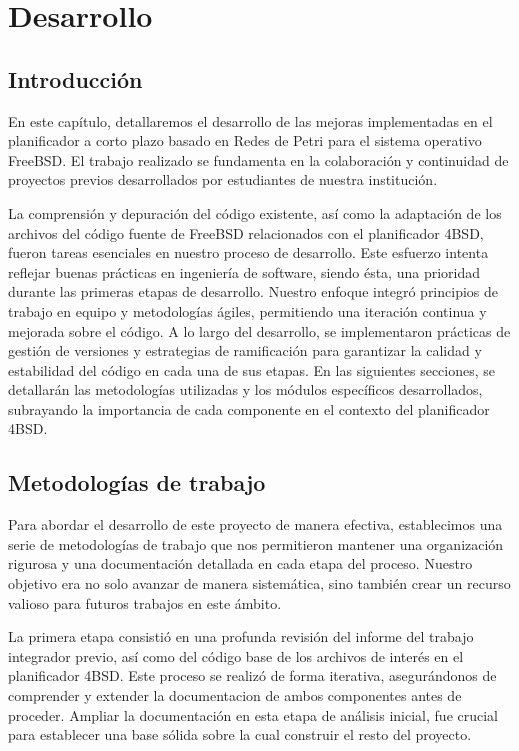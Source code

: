 \section{Desarrollo}

\subsection{Introducción}
En este capítulo, detallaremos el desarrollo de las mejoras implementadas en el planificador a corto plazo basado en Redes de Petri para el sistema operativo FreeBSD. El trabajo realizado se fundamenta en la colaboración y continuidad de proyectos previos desarrollados por estudiantes de nuestra institución.\par

La comprensión y depuración del código existente, así como la adaptación de los archivos del código fuente de FreeBSD relacionados con el planificador 4BSD, fueron tareas esenciales en nuestro proceso de desarrollo. Este esfuerzo intenta reflejar buenas prácticas en ingeniería de software, siendo ésta, una prioridad durante las primeras etapas de desarrollo. Nuestro enfoque integró principios de trabajo en equipo y metodologías ágiles, permitiendo una iteración continua y mejorada sobre el código. A lo largo del desarrollo, se implementaron prácticas de gestión de versiones y estrategias de ramificación para garantizar la calidad y estabilidad del código en cada una de sus etapas. En las siguientes secciones, se detallarán las metodologías utilizadas y los módulos específicos desarrollados, subrayando la importancia de cada componente en el contexto del planificador 4BSD.\par


\subsection{Metodologías de trabajo}

Para abordar el desarrollo de este proyecto de manera efectiva, establecimos una serie de metodologías de trabajo que nos permitieron mantener una organización rigurosa y una documentación detallada en cada etapa del proceso. Nuestro objetivo era no solo avanzar de manera sistemática, sino también crear un recurso valioso para futuros trabajos en este ámbito.

La primera etapa consistió en una profunda revisión del informe del trabajo integrador previo, así como del código base de los archivos de interés en el planificador 4BSD. Este proceso se realizó de forma iterativa, asegurándonos de comprender y extender la documentacion de ambos componentes antes de proceder. Ampliar la documentación en esta etapa de análisis inicial, fue crucial para establecer una base sólida sobre la cual construir el resto del proyecto.

